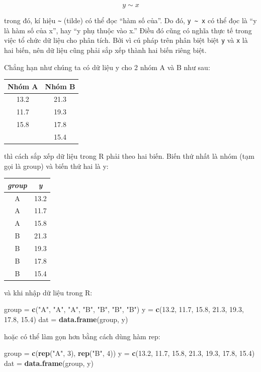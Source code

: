 \documentclass[
]{book}
\newenvironment{Shaded}{\begin{snugshade}}{\end{snugshade}}
\newcommand{\DecValTok}[1]{\textcolor[rgb]{0.00,0.00,0.81}{#1}}
\newcommand{\FloatTok}[1]{\textcolor[rgb]{0.00,0.00,0.81}{#1}}
\newcommand{\KeywordTok}[1]{\textcolor[rgb]{0.13,0.29,0.53}{\textbf{#1}}}
\newcommand{\NormalTok}[1]{#1}
\newcommand{\StringTok}[1]{\textcolor[rgb]{0.31,0.60,0.02}{#1}}
\begin{document}
\[y \sim x\]

trong đó, kí hiệu \texttt{\textasciitilde{}} (tilde) có thể đọc ``hàm số của''. Do đó, \texttt{y\ \textasciitilde{}\ x} có thể đọc là ``y là hàm số của x'', hay ``y phụ thuộc vào x.'' Điều đó cũng có nghĩa thực tế trong việc tổ chức dữ liệu cho phân tích. Bởi vì cú pháp trên phân biệt biệt \texttt{y} và \texttt{x} là hai biến, nên dữ liệu cũng phải sắp xếp thành hai biến riêng biệt.

Chẳng hạn như chúng ta có dữ liệu y cho 2 nhóm A và B như sau:

\begin{longtable}[]{@{}cc@{}}
\toprule
\textbf{Nhóm A} & \textbf{Nhóm B}\tabularnewline
\midrule
\endhead
13.2 & 21.3\tabularnewline
11.7 & 19.3\tabularnewline
15.8 & 17.8\tabularnewline
& 15.4\tabularnewline
\bottomrule
\end{longtable}

thì cách sắp xếp dữ liệu trong R phải theo hai biến. Biến thứ nhất là nhóm (tạm gọi là group) và biến thứ hai là y:

\begin{longtable}[]{@{}cc@{}}
\toprule
\emph{group} & \emph{y}\tabularnewline
\midrule
\endhead
A & 13.2\tabularnewline
A & 11.7\tabularnewline
A & 15.8\tabularnewline
B & 21.3\tabularnewline
B & 19.3\tabularnewline
B & 17.8\tabularnewline
B & 15.4\tabularnewline
\bottomrule
\end{longtable}

và khi nhập dữ liệu trong R:

\begin{Shaded}
\begin{Highlighting}[]
\NormalTok{group =}\StringTok{ }\KeywordTok{c}\NormalTok{(}\StringTok{"A"}\NormalTok{, }\StringTok{"A"}\NormalTok{, }\StringTok{"A"}\NormalTok{, }\StringTok{"B"}\NormalTok{, }\StringTok{"B"}\NormalTok{, }\StringTok{"B"}\NormalTok{, }\StringTok{"B"}\NormalTok{) }
\NormalTok{y =}\StringTok{ }\KeywordTok{c}\NormalTok{(}\FloatTok{13.2}\NormalTok{, }\FloatTok{11.7}\NormalTok{, }\FloatTok{15.8}\NormalTok{, }\FloatTok{21.3}\NormalTok{, }\FloatTok{19.3}\NormalTok{, }\FloatTok{17.8}\NormalTok{, }\FloatTok{15.4}\NormalTok{) }
\NormalTok{dat =}\StringTok{ }\KeywordTok{data.frame}\NormalTok{(group, y) }
\end{Highlighting}
\end{Shaded}

hoặc có thể làm gọn hơn bằng cách dùng hàm rep:

\begin{Shaded}
\begin{Highlighting}[]
\NormalTok{group =}\StringTok{ }\KeywordTok{c}\NormalTok{(}\KeywordTok{rep}\NormalTok{(}\StringTok{"A"}\NormalTok{, }\DecValTok{3}\NormalTok{), }\KeywordTok{rep}\NormalTok{(}\StringTok{"B"}\NormalTok{, }\DecValTok{4}\NormalTok{))}
\NormalTok{y =}\StringTok{ }\KeywordTok{c}\NormalTok{(}\FloatTok{13.2}\NormalTok{, }\FloatTok{11.7}\NormalTok{, }\FloatTok{15.8}\NormalTok{, }\FloatTok{21.3}\NormalTok{, }\FloatTok{19.3}\NormalTok{, }\FloatTok{17.8}\NormalTok{, }\FloatTok{15.4}\NormalTok{) }
\NormalTok{dat =}\StringTok{ }\KeywordTok{data.frame}\NormalTok{(group, y) }
\end{Highlighting}
\end{Shaded}
\end{document}
